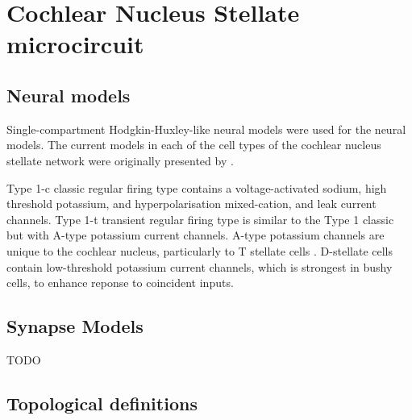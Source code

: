 




\section{Cochlear Nucleus Stellate microcircuit    \label{sec:CN:cochl-nucl-stell}}

\subsection{Neural models}

Single-compartment Hodgkin-Huxley-like neural models were used for the neural models.  
The current models in each of the cell types of the cochlear nucleus stellate network were originally presented by \citet{RothmanManis:2003b}.


Type 1-c classic regular firing type contains a voltage-activated sodium, high threshold potassium, and hyperpolarisation mixed-cation, and leak current channels.  
Type 1-t transient regular firing type is similar to the Type 1 classic but with A-type potassium current channels.
A-type potassium channels are unique to the cochlear nucleus, particularly to T stellate cells \citep{RothmanManis:2003,RothmanManis:2003a,RothmanManis:2003b}. 
D-stellate cells contain low-threshold potassium current channels, which is strongest in bushy cells, to enhance reponse to coincident inputs.




\subsection{Synapse Models}

TODO

\subsection{Topological definitions    \label{sec:CN:tonot-conn}}

